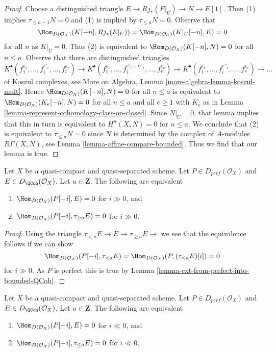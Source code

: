 \begin{proof}
Choose a distinguished triangle $E \to Rj_*(E|_U) \to N \to E[1]$. Then (1)
implies $\tau_{\leq a - 1}N = 0$ and (1) is implied by $\tau_{\leq a}N = 0$.
Observe that
$$
\Hom_{D(\mathcal{O}_X)}(K[-n], Rj_*(E|_U)) =
\Hom_{D(\mathcal{O}_U)}(K|_U[-n], E) = 0
$$
for all $n$ as $K|_U = 0$. Thus (2) is equivalent to
$\Hom_{D(\mathcal{O}_X)}(K[-n], N) = 0$ for all $n \leq a$. 
Observe that there are distinguished triangles
$$
K^\bullet(f_1^{e_1}, \ldots, f_i^{e'_i}, \ldots, f_r^{e_r}) \to
K^\bullet(f_1^{e_1}, \ldots, f_i^{e'_i + e''_i}, \ldots, f_r^{e_r}) \to
K^\bullet(f_1^{e_1}, \ldots, f_i^{e''_i}, \ldots, f_r^{e_r}) \to \ldots
$$
of Koszul complexes, see
More on Algebra, Lemma \ref{more-algebra-lemma-koszul-mult}. Hence
$\Hom_{D(\mathcal{O}_X)}(K[-n], N) = 0$ for all $n \leq a$
is equivalent to
$\Hom_{D(\mathcal{O}_X)}(K_e[-n], N) = 0$ for all $n \leq a$ and all $e \geq 1$
with $K_e$ as in Lemma \ref{lemma-represent-cohomology-class-on-closed}.
Since $N|_U = 0$, that lemma implies that this in turn is equivalent to
$H^n(X, N) = 0$ for $n \leq a$. We conclude that (2) is equivalent to
$\tau_{\leq a}N = 0$ since $N$ is determined by the complex of
$A$-modules $R\Gamma(X, N)$, see Lemma \ref{lemma-affine-compare-bounded}.
Thus we find that our lemma is true.
\end{proof}

\begin{lemma}
\label{lemma-bounded-truncation}
Let $X$ be a quasi-compact and quasi-separated scheme.
Let $P \in D_{perf}(\mathcal{O}_X)$ and $E \in D_{\QCoh}(\mathcal{O}_X)$. 
Let $a \in \mathbf{Z}$. The following are equivalent
\begin{enumerate}
\item $\Hom_{D(\mathcal{O}_X)}(P[-i], E) = 0$ for $i \gg 0$, and
\item $\Hom_{D(\mathcal{O}_X)}(P[-i], \tau_{\geq a} E) = 0$ for $i \gg 0$.
\end{enumerate}
\end{lemma}

\begin{proof}
Using the triangle $ \tau_{< a} E \to E \to \tau_{\geq a} E \to$
we see that the equivalence follows if we can show
$$
\Hom_{D(\mathcal{O}_X)}(P[-i], \tau_{< a} E) =
\Hom_{D(\mathcal{O}_X)}(P, (\tau_{< a} E)[i]) = 0 
$$
for $i \gg 0$. As $P$ is perfect this is true by
Lemma \ref{lemma-ext-from-perfect-into-bounded-QCoh}.
\end{proof}

\begin{lemma}
\label{lemma-bounded-below-truncation}
Let $X$ be a quasi-compact and quasi-separated scheme. Let
$P \in D_{perf}(\mathcal{O}_X)$ and $E \in D_{\QCoh}(\mathcal{O}_X)$.
Let $a \in \mathbf{Z}$. The following are equivalent
\begin{enumerate}
\item $\Hom_{D(\mathcal{O}_X)}(P[-i], E) = 0$ for $i \ll 0$, and
\item $\Hom_{D(\mathcal{O}_X)}(P[-i], \tau_{\leq a} E) = 0$ for $i \ll 0$.
\end{enumerate}
\end{lemma}

